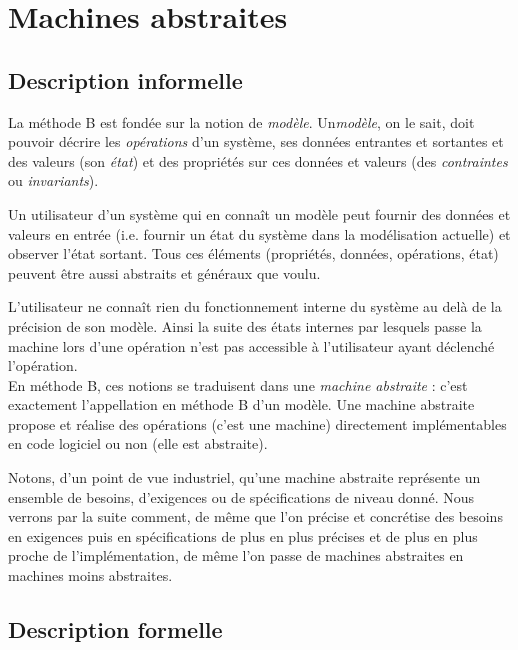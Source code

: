 \documentclass[10pt,a4paper]{article}
\begin{document}
\section{Machines abstraites}

\subsection{Description informelle}

La méthode B est fondée sur la notion de \emph{modèle}. Un\emph{modèle}, on le sait, doit pouvoir décrire les \emph{opérations} d'un système, ses données entrantes et sortantes et des valeurs (son \emph{état}) et des propriétés sur ces données et valeurs (des \emph{contraintes} ou \emph{invariants}).

Un utilisateur d'un système qui en connaît un modèle peut fournir des données et valeurs en entrée (i.e. fournir un état du système dans la modélisation actuelle) et observer l'état sortant. Tous ces  éléments (propriétés, données, opérations, état) peuvent être aussi abstraits et généraux que voulu.

L'utilisateur ne connaît rien du fonctionnement interne du système au delà de la précision de son modèle. Ainsi la suite des états internes par lesquels passe la machine lors d'une opération n'est pas accessible à l'utilisateur ayant déclenché l'opération.
\\

En méthode B, ces notions se traduisent dans une \emph{machine abstraite} : c'est exactement l'appellation en méthode B d'un modèle. Une machine abstraite propose et réalise des opérations (c'est une machine) directement implémentables en code logiciel ou non (elle est abstraite).

Notons, d'un point de vue industriel, qu'une machine abstraite représente un ensemble de besoins, d'exigences ou de spécifications de niveau donné. Nous verrons par la suite comment, de même que l'on précise et concrétise des besoins en exigences puis en spécifications de plus en plus précises et de plus en plus proche de l'implémentation, de même l'on passe de machines abstraites en machines moins abstraites.

\subsection{Description formelle}
\end{document}
